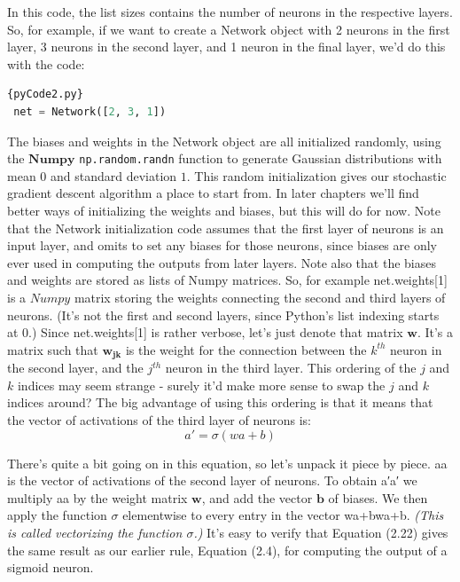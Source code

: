 \documentclass[a4paper,12pt]{report}%
\begin{document}
In this code, the list sizes contains the number of neurons in the respective layers. So, for example, if we want to create a Network object with 2 neurons in the first layer, 3 neurons in the second layer, and 1 neuron in the final layer, we'd do this with the code:

\begin{lstlisting}[language=Python,breaklines,basicstyle=\footnotesize\ttfamily]{pyCode2.py}
 net = Network([2, 3, 1])
\end{lstlisting}

The biases and weights in the Network object are all initialized randomly, using the $\mathbf{Numpy}$ \texttt{np.random.randn} function to generate Gaussian distributions with mean $0$ and standard deviation $1$. This random initialization gives our stochastic gradient descent algorithm a place to start from. In later chapters we'll find better ways of initializing the weights and biases, but this will do for now. Note that the Network initialization code assumes that the first layer of neurons is an input layer, and omits to set any biases for those neurons, since biases are only ever used in computing the outputs from later layers.
Note also that the biases and weights are stored as lists of Numpy matrices. So, for example net.weights[1] is a $Numpy$ matrix storing the weights connecting the second and third layers of neurons. (It's not the first and second layers, since Python's list indexing starts at 0.) Since net.weights[1] is rather verbose, let's just denote that matrix $\mathbf{w}$. It's a matrix such that $\mathbf{w_{jk}}$ is the weight for the connection between the $k^{th}$ neuron in the second layer, and the $j^{th}$ neuron in the third layer. This ordering of the $j$ and $k$ indices may seem strange - surely it'd make more sense to swap the $j$ and $k$ indices around? The big advantage of using this ordering is that it means that the vector of activations of the third layer of neurons is:
\begin{equation}
 a′ = \sigma (wa + b)
\end{equation}

There's quite a bit going on in this equation, so let's unpack it piece by piece. aa is the vector of activations of the second layer of neurons. To obtain a′a′ we multiply aa by the weight matrix $\mathbf{w}$, and add the vector $\mathbf{b}$ of biases. We then apply the function $\sigma$ elementwise to every entry in the vector wa+bwa+b. {\it (This is called vectorizing the function $\sigma$.)} It's easy to verify that Equation (2.22) gives the same result as our earlier rule, Equation (2.4), for computing the output of a sigmoid neuron.
\end{document}
